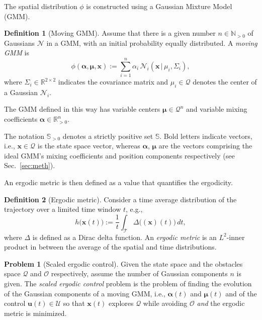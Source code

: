 \documentclass[letterpaper,10pt,conference,twoside]{IEEEtran}
\theoremstyle{definition}
\newtheorem{defn}{Definition}[section]
\newtheorem{pb}{Problem}[section]
\begin{document}
The spatial distribution $\phi$ is constructed using a Gaussian Mixture Model (GMM). 
\begin{defn}[Moving GMM]\label{def:movement}
  Assume that there is a given number $n\in\mathbb{N}_{>0}$ of Gaussians $\mathcal{N}$ in a GMM, with an initial probability equally distributed. A \textit{moving GMM} is \begin{equation}
    \phi(\boldsymbol{\alpha},\boldsymbol{\mu},\mathbf{x}):=\sum_{i=1}^n{\alpha_i\,\mathcal{N}_i(\mathbf{x}\,|\,\mu_i,\Sigma_i)},
  \end{equation}
  where $\Sigma_i\in\mathbb{R}^{2\times 2}$ indicates the covariance matrix and $\mu_i\in\mathcal{Q}$ denotes the center of a Gaussian $\mathcal{N}_i$. 
\end{defn}

The GMM defined in this way has variable centers $\boldsymbol{\mu}\in\mathcal{Q}^n$ and variable mixing coefficients $\boldsymbol{\alpha}\in\mathbb{R}_{>0}^n$.

The notation $\mathbb{S}_{>0}$ denotes a strictly positive set $\mathbb{S}$. Bold letters indicate vectors, i.e., $\mathbf{x}\in\mathcal{Q}$ is the state space vector, whereas $\boldsymbol{\alpha}$, $\boldsymbol{\mu}$  are the vectors comprising the ideal GMM's mixing coefficients and position components respectively (see Sec.~\ref{sec:meth}).

An ergodic metric is then defined as a value that quantifies the ergodicity.
\begin{defn}[Ergodic metric]\label{def:ergomet}
  Consider a time average distribution of the trajectory over a limited time window $t$, e.g.,
  \begin{equation}
    h\big(\mathbf{x}(t)\big):=\frac{1}{t}\int_\mathcal{T}\Delta\big((\mathbf{x})(t)\big)\,dt,
  \end{equation}
  where $\Delta$ is defined as a Dirac delta function. An \textit{ergodic metric} is an $L^2$-inner product in between the average of the spatial and time distributions.
\end{defn}

\begin{pb}[Scaled ergodic control]\label{pb}
  Given the state space and the obstacles space $\mathcal{Q}$ and $\mathcal{O}$ respectively, assume the number of Gaussian components $n$ is given. The \textit{scaled ergodic control} problem is the problem of finding the evolution of the Gaussian components of a moving GMM, i.e., $\boldsymbol{\alpha}(t)$ and $\boldsymbol{\mu}(t)$ and of the control $\mathbf{u}(t)\in\mathcal{U}$ so that $\mathbf{x}(t)$ explores $\mathcal{Q}$ while avoiding $\mathcal{O}$ \textit{and} the ergodic metric is minimized.
\end{pb}
\end{document}
